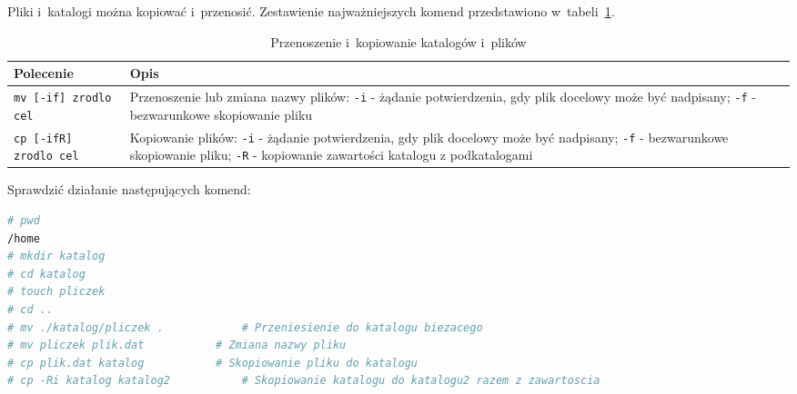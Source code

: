 \documentclass[11pt,twoside,a4paper]{article}
\begin{document}
\begin{example}
\end{example}


\begin{example}

Pliki i~katalogi można kopiować i~przenosić. Zestawienie najważniejszych komend przedstawiono w~tabeli~\ref{tab:przenos}. 

\begin{table}[h!]
\centering
\caption{Przenoszenie i~kopiowanie katalogów i~plików}
\setlength{\arrayrulewidth}{1pt}
\setlength{\tabcolsep}{6pt}
\renewcommand{\arraystretch}{1.2}
\begin{tabular}{ |p{}|p{}|}
\hline \rowcolor{gray}
\textbf{Polecenie} & \textbf{Opis} \\ \hline
\mbox{\lstinline[deletekeywords={if}]{mv [-if] zrodlo cel}} & Przenoszenie lub zmiana nazwy plików: \mbox{\lstinline{-i}} - żądanie potwierdzenia, gdy plik docelowy może być nadpisany; \mbox{\lstinline{-f}} - bezwarunkowe skopiowanie pliku \\ \hline 
\mbox{\lstinline{cp [-ifR] zrodlo cel}}  & Kopiowanie plików: \mbox{\lstinline{-i}} - żądanie potwierdzenia, gdy plik docelowy może być nadpisany; \mbox{\lstinline{-f}} - bezwarunkowe skopiowanie pliku; \mbox{\lstinline{-R}} - kopiowanie zawartości katalogu z podkatalogami \\ \hline
\end{tabular}
\label{tab:przenos}
\end{table}

Sprawdzić działanie następujących komend: 

\begin{lstlisting}[language=bash]
# pwd
/home 
# mkdir katalog
# cd katalog 
# touch pliczek
# cd ..
# mv ./katalog/pliczek .			# Przeniesienie do katalogu biezacego
# mv pliczek plik.dat			# Zmiana nazwy pliku
# cp plik.dat katalog			# Skopiowanie pliku do katalogu
# cp -Ri katalog katalog2			# Skopiowanie katalogu do katalogu2 razem z zawartoscia
\end{lstlisting}
\end{example}
\end{document}
